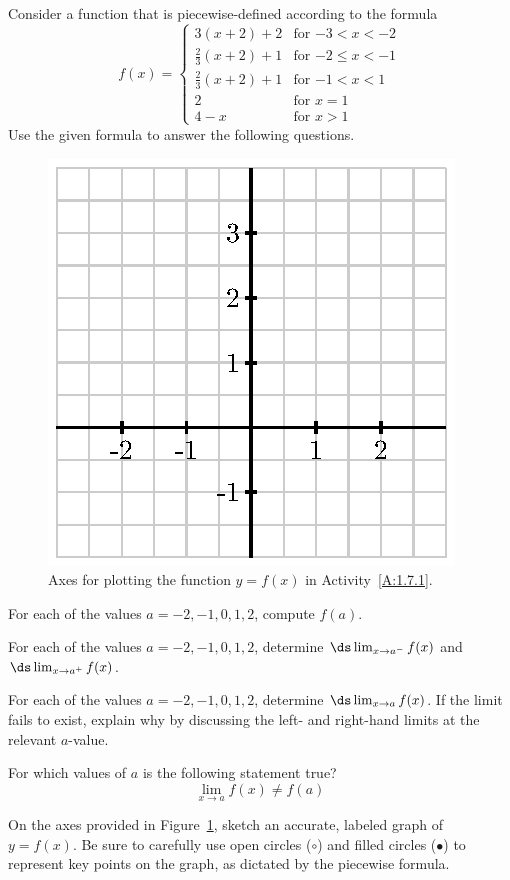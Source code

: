 \begin{activity} \label{A:1.7.1}
Consider a function that is piecewise-defined according to the formula
$$f(x) = \begin{cases}

  3(x+2)+2 & \text{for $-3 < x < -2$} \\
  \frac{2}{3}(x+2)+1 & \text{for $-2 \le x < -1$} \\
  \frac{2}{3}(x+2)+1 & \text{for $-1 < x < 1$} \\
  2 & \text{for $x = 1$} \\
  4-x & \text{for $x > 1$}

\end{cases}$$
Use the given formula to answer the following questions.
\begin{figure}[h]
\begin{center}
\includegraphics{figures/1_7_Act1.eps}
\caption{Axes for plotting the function $y = f(x)$ in Activity~\ref{A:1.7.1}.} \label{F:1.7.Act1}
\end{center}
\end{figure}
\ba
	\item For each of the values $a = -2, -1, 0, 1, 2$, compute $f(a)$.
	\item For each of the values $a = -2, -1, 0, 1, 2$, determine $\ds \lim_{x \to a^-} f(x)$ and $\ds \lim_{x \to a^+} f(x)$.  
	\item For each of the values $a = -2, -1, 0, 1, 2$, determine $\ds \lim_{x \to a} f(x)$.  If the limit fails to exist, explain why by discussing the left- and right-hand limits at the relevant $a$-value.
	\item For which values of $a$ is the following statement true?
	$$\lim_{x \to a} f(x) \ne f(a)$$
	\item On the axes provided in Figure~\ref{F:1.7.Act1}, sketch an accurate, labeled graph of $y = f(x)$.  Be sure to carefully use open circles ($\circ$) and filled circles ($\bullet$) to represent key points on the graph, as dictated by the piecewise formula.
\ea

\end{activity}
